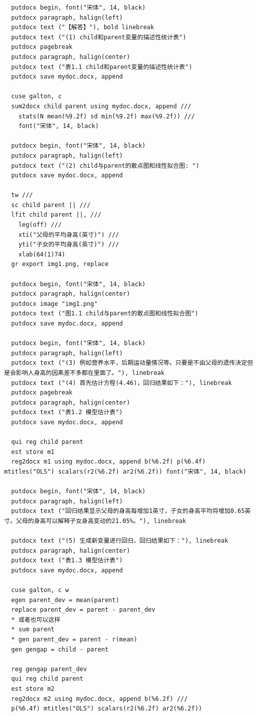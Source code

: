 \documentclass[cn,fancy,blue,11pt]{elegantbook}
\begin{document}
\begin{lstlisting}
  putdocx begin, font("宋体", 14, black)
  putdocx paragraph, halign(left)
  putdocx text ("【解答】"), bold linebreak
  putdocx text ("(1) child和parent变量的描述性统计表")
  putdocx pagebreak
  putdocx paragraph, halign(center)
  putdocx text ("表1.1 child和parent变量的描述性统计表")
  putdocx save mydoc.docx, append

  cuse galton, c
  sum2docx child parent using mydoc.docx, append ///
  	stats(N mean(%9.2f) sd min(%9.2f) max(%9.2f)) ///
  	font("宋体", 14, black)

  putdocx begin, font("宋体", 14, black)
  putdocx paragraph, halign(left)
  putdocx text ("(2) child与parent的散点图和线性拟合图: ")
  putdocx save mydoc.docx, append

  tw ///
  sc child parent || ///
  lfit child parent ||, ///
  	leg(off) ///
  	xti("父母的平均身高(英寸)") ///
  	yti("子女的平均身高(英寸)") ///
  	xlab(64(1)74)
  gr export img1.png, replace

  putdocx begin, font("宋体", 14, black)
  putdocx paragraph, halign(center)
  putdocx image "img1.png"
  putdocx text ("图1.1 child与parent的散点图和线性拟合图")
  putdocx save mydoc.docx, append

  putdocx begin, font("宋体", 14, black)
  putdocx paragraph, halign(left)
  putdocx text ("(3) 例如营养水平，后期运动量情况等。只要是不由父母的遗传决定但是会影响人身高的因素差不多都在里面了。"), linebreak
  putdocx text ("(4) 首先估计方程(4.46)，回归结果如下："), linebreak
  putdocx pagebreak
  putdocx paragraph, halign(center)
  putdocx text ("表1.2 模型估计表")
  putdocx save mydoc.docx, append

  qui reg child parent
  est store m1
  reg2docx m1 using mydoc.docx, append b(%6.2f) p(%6.4f) mtitles("OLS") scalars(r2(%6.2f) ar2(%6.2f)) font("宋体", 14, black)

  putdocx begin, font("宋体", 14, black)
  putdocx paragraph, halign(left)
  putdocx text ("回归结果显示父母的身高每增加1英寸，子女的身高平均将增加0.65英寸。父母的身高可以解释子女身高变动的21.05%。"), linebreak

  putdocx text ("(5) 生成新变量进行回归，回归结果如下："), linebreak
  putdocx paragraph, halign(center)
  putdocx text ("表1.3 模型估计表")
  putdocx save mydoc.docx, append

  cuse galton, c w
  egen parent_dev = mean(parent)
  replace parent_dev = parent - parent_dev
  * 或者也可以这样
  * sum parent
  * gen parent_dev = parent - r(mean)
  gen gengap = child - parent

  reg gengap parent_dev
  qui reg child parent
  est store m2
  reg2docx m2 using mydoc.docx, append b(%6.2f) ///
  p(%6.4f) mtitles("OLS") scalars(r2(%6.2f) ar2(%6.2f))


\end{lstlisting}
\end{document}
